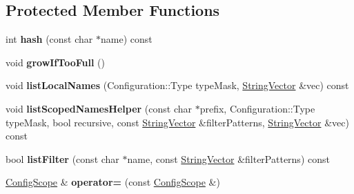 \subsection*{Protected Member Functions}
\begin{DoxyCompactItemize}
\item 
\hypertarget{classCONFIG4CPP__NAMESPACE_1_1ConfigScope_ae77738a5402736d20f35c3b8e417e93d}{int {\bfseries hash} (const char $\ast$name) const }\label{classCONFIG4CPP__NAMESPACE_1_1ConfigScope_ae77738a5402736d20f35c3b8e417e93d}

\item 
\hypertarget{classCONFIG4CPP__NAMESPACE_1_1ConfigScope_afb65eea5721ffcbc64612346b751aaa7}{void {\bfseries grow\-If\-Too\-Full} ()}\label{classCONFIG4CPP__NAMESPACE_1_1ConfigScope_afb65eea5721ffcbc64612346b751aaa7}

\item 
\hypertarget{classCONFIG4CPP__NAMESPACE_1_1ConfigScope_abb3d10b2b4a0677601c436956d71d986}{void {\bfseries list\-Local\-Names} (Configuration\-::\-Type type\-Mask, \hyperlink{classCONFIG4CPP__NAMESPACE_1_1StringVector}{String\-Vector} \&vec) const }\label{classCONFIG4CPP__NAMESPACE_1_1ConfigScope_abb3d10b2b4a0677601c436956d71d986}

\item 
\hypertarget{classCONFIG4CPP__NAMESPACE_1_1ConfigScope_a9bb347d4123de91e2224cb6465301f7e}{void {\bfseries list\-Scoped\-Names\-Helper} (const char $\ast$prefix, Configuration\-::\-Type type\-Mask, bool recursive, const \hyperlink{classCONFIG4CPP__NAMESPACE_1_1StringVector}{String\-Vector} \&filter\-Patterns, \hyperlink{classCONFIG4CPP__NAMESPACE_1_1StringVector}{String\-Vector} \&vec) const }\label{classCONFIG4CPP__NAMESPACE_1_1ConfigScope_a9bb347d4123de91e2224cb6465301f7e}

\item 
\hypertarget{classCONFIG4CPP__NAMESPACE_1_1ConfigScope_aa9df66ae25814884e1827a7cc7b17b15}{bool {\bfseries list\-Filter} (const char $\ast$name, const \hyperlink{classCONFIG4CPP__NAMESPACE_1_1StringVector}{String\-Vector} \&filter\-Patterns) const }\label{classCONFIG4CPP__NAMESPACE_1_1ConfigScope_aa9df66ae25814884e1827a7cc7b17b15}

\item 
\hypertarget{classCONFIG4CPP__NAMESPACE_1_1ConfigScope_aba00a73bd33dbe9262f1c404291c2b04}{\hyperlink{classCONFIG4CPP__NAMESPACE_1_1ConfigScope}{Config\-Scope} \& {\bfseries operator=} (const \hyperlink{classCONFIG4CPP__NAMESPACE_1_1ConfigScope}{Config\-Scope} \&)}\label{classCONFIG4CPP__NAMESPACE_1_1ConfigScope_aba00a73bd33dbe9262f1c404291c2b04}

\end{DoxyCompactItemize}
